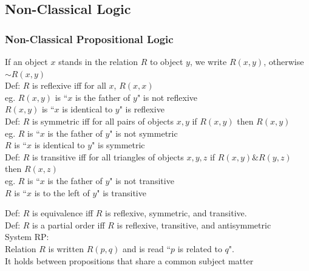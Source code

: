 \documentclass[11pt, fleqn]{article}
\begin{document}
\subsection{Non-Classical Logic}
\subsubsection{Non-Classical Propositional Logic}

If an object $x$ stands in the relation $R$ to object $y$, we write $R(x,y)$, otherwise $\sim R(x,y)$\\

Def: $R$ is reflexive iff for all $x$, $R(x,x)$\\
eg. $R(x,y)$ is ``$x$ is the father of $y$" is not reflexive\\
$R(x,y)$ is ``$x$ is identical to $y$" is reflexive\\

Def: $R$ is symmetric iff for all pairs of objects $x,y$ if $R(x,y)$ then $R(x,y)$\\
eg. $R$ is ``$x$ is the father of $y$" is not symmetric\\
$R$ is ``$x$ is identical to $y$" is symmetric\\

Def: $R$ is transitive iff for all triangles of objects $x,y,z$ if $R(x,y)\& R(y,z)$ then $R(x,z)$\\
eg. $R$ is ``$x$ is the father of $y$" is not transitive\\
$R$ is ``$x$ is to the left of $y$" is transitive

Def: $R$ is equivalence iff $R$ is reflexive, symmetric, and transitive.\\

Def: $R$ is a partial order iff $R$ is reflexive, transitive, and antisymmetric\\

System RP:\\
Relation $R$ is written $R(p,q)$ and is read ``$p$ is related to $q$".\\
It holds between propositions that share a common subject matter
\end{document}
